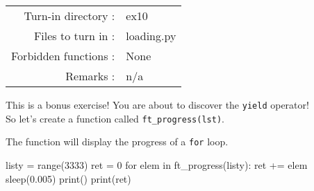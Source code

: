 \documentclass[]{article}
\newenvironment{Shaded}{\begin{snugshade}}{\end{snugshade}}
\newcommand{\BuiltInTok}[1]{\textcolor[rgb]{0.50,0.55,0.55}{#1}}
\newcommand{\ControlFlowTok}[1]{\textcolor[rgb]{0.99,0.74,0.29}{#1}}
\newcommand{\DecValTok}[1]{\textcolor[rgb]{0.96,0.45,0.00}{#1}}
\newcommand{\FloatTok}[1]{\textcolor[rgb]{0.96,0.45,0.00}{#1}}
\newcommand{\KeywordTok}[1]{\textcolor[rgb]{0.81,0.81,0.76}{#1}}
\newcommand{\NormalTok}[1]{\textcolor[rgb]{0.81,0.81,0.76}{#1}}
\newcommand{\OperatorTok}[1]{\textcolor[rgb]{0.81,0.81,0.76}{#1}}
\begin{document}
\begin{longtable}[]{@{}rl@{}}
\toprule
\endhead
Turn-in directory : & ex10\tabularnewline
Files to turn in : & loading.py\tabularnewline
Forbidden functions : & None\tabularnewline
Remarks : & n/a\tabularnewline
\bottomrule
\end{longtable}

This is a bonus exercise! You are about to discover the \texttt{yield}
operator!\\
So let's create a function called \texttt{ft\_progress(lst)}.

The function will display the progress of a \texttt{for} loop.

\begin{Shaded}
\end{Shaded}

\begin{Shaded}
\end{Shaded}

\begin{Shaded}
\begin{Highlighting}[]
\NormalTok{listy }\OperatorTok{=} \BuiltInTok{range}\NormalTok{(}\DecValTok{3333}\NormalTok{)}
\NormalTok{ret }\OperatorTok{=} \DecValTok{0}
\ControlFlowTok{for}\NormalTok{ elem }\KeywordTok{in}\NormalTok{ ft_progress(listy):}
\NormalTok{    ret }\OperatorTok{+=}\NormalTok{ elem}
\NormalTok{    sleep(}\FloatTok{0.005}\NormalTok{)}
\BuiltInTok{print}\NormalTok{()}
\BuiltInTok{print}\NormalTok{(ret)}
\end{Highlighting}
\end{Shaded}

\begin{Shaded}
\end{Shaded}

\clearpage
\end{document}
